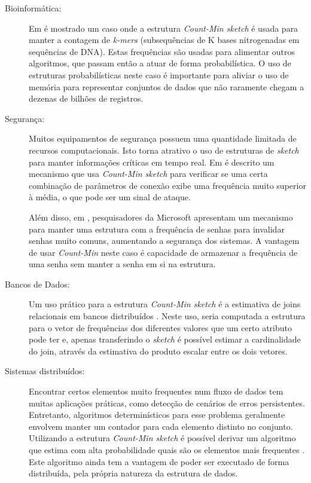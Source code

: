 \begin{description}

\item[Bioinformática:]

Em \cite{zhang2014these} é mostrado um caso onde a estrutura \emph{Count-Min sketch} é usada para manter a contagem de \emph{k-mers} (subsequências de K bases nitrogenadas em sequências de DNA). Estas frequências são usadas para alimentar outros algoritmos, que passam então a atuar de forma probabilística. O uso de estruturas probabilísticas neste caso é importante para aliviar o uso de memória para representar conjuntos de dados que não raramente chegam a dezenas de bilhões de registros.

\item[Segurança:]

Muitos equipamentos de segurança possuem uma quantidade limitada de recursos computacionais. Isto torna atrativo o uso de estruturas de \emph{sketch} para manter informações críticas em tempo real. Em \cite{salem2008novel} é descrito um mecanismo que usa \emph{Count-Min sketch} para verificar se uma certa combinação de parâmetros de conexão exibe uma frequência muito superior à média, o que pode ser um sinal de ataque.

Além disso, em \cite{schechterpopularity}, pesquisadores da Microsoft apresentam um mecanismo para manter uma estrutura com a frequência de senhas para invalidar senhas muito comuns, aumentando a segurança dos sistemas. A vantagem de usar \emph{Count-Min} neste caso é capacidade de armazenar a frequência de uma senha sem manter a senha em si na estrutura.

\item[Bancos de Dados:]

Um uso prático para a estrutura \emph{Count-Min sketch} é a estimativa de joins relacionais em bancos distribuídos \cite{cormode2005improved,rusu2007statistical}. Neste uso, seria computada a estrutura para o vetor de frequências dos diferentes valores que um certo atributo pode ter e, apenas transferindo o \emph{sketch} é possível estimar a cardinalidade do join, através da estimativa do produto escalar entre os dois vetores.

\item[Sistemas distribuídos:]

Encontrar certos elementos muito frequentes num fluxo de dados tem muitas aplicações práticas, como detecção de cenários de erros persistentes. Entretanto, algoritmos determinísticos para esse problema geralmente envolvem manter um contador para cada elemento distinto no conjunto. Utilizando a estrutura \emph{Count-Min sketch} é possível derivar um algoritmo que estima com alta probabilidade quais são os elementos mais frequentes \cite{zhao2006finding}. Este algoritmo ainda tem a vantagem de poder ser executado de forma distribuída, pela própria natureza da estrutura de dados.




\end{description}

